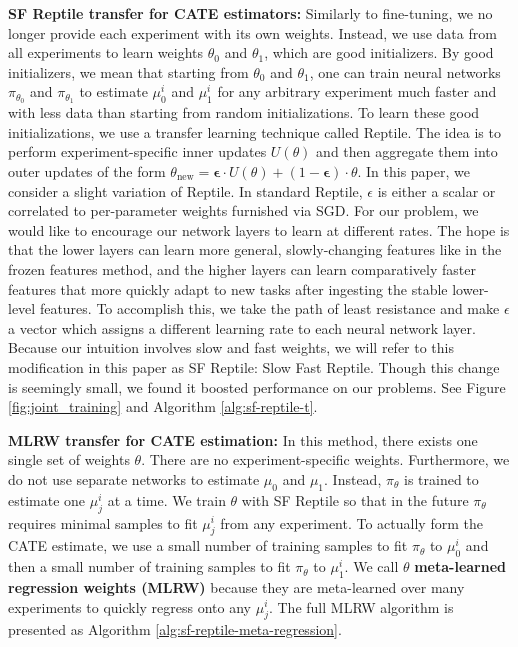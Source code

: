 
\textbf{SF Reptile transfer for CATE estimators:} Similarly to fine-tuning, we no longer provide each experiment with its own weights. Instead, we use data from all experiments to learn weights $\theta_0$ and $\theta_1$, which are good initializers. By good initializers, we mean that starting from $\theta_0$ and $\theta_1$, one can train neural networks $\pi_{\theta_0}$ and $\pi_{\theta_1}$ to estimate $\mu^i_0$ and $\mu^i_1$ for any arbitrary experiment much faster and with less data than starting from random initializations. To learn these good initializations, we use a transfer learning technique called Reptile. The idea is to perform experiment-specific inner updates $U(\theta)$ and then aggregate them into outer updates of the form $\theta_{\text{new}} = \mathbf{\epsilon} \cdot U(\theta) + (1- \mathbf{\epsilon}) \cdot \theta$. In this paper, we consider a slight variation of Reptile. In standard Reptile, $\epsilon$ is either a scalar or correlated to per-parameter weights furnished via SGD. For our problem, we would like to encourage our network layers to learn at different rates. The hope is that the lower layers can learn more general, slowly-changing features like in the frozen features method, and the higher layers can learn comparatively faster features that more quickly adapt to new tasks after ingesting the stable lower-level features. To accomplish this, we take the path of least resistance and make $\epsilon$ a vector which assigns  a different learning rate to each neural network layer. Because our intuition involves slow and fast weights, we will refer to this modification in this paper as SF Reptile: Slow Fast Reptile. Though this change is seemingly small, we found it boosted performance on our problems. See Figure \ref{fig:joint_training} and Algorithm \ref{alg:sf-reptile-t}.

\textbf{MLRW transfer for CATE estimation:} In this method, there exists one single set of weights $\theta$. There are no experiment-specific weights. Furthermore, we do not use separate networks to estimate $\mu_0$ and $\mu_1$. Instead, $\pi_\theta$ is trained to estimate one $\mu_j^i$ at a time. We train $\theta$ with SF Reptile so that in the future $\pi_\theta$ requires minimal samples to fit $\mu_j^i$ from any experiment. To actually form the CATE estimate, we use a small number of training samples to fit $\pi_\theta$ to $\mu_0^i$ and then a small number of training samples to fit $\pi_\theta$ to $\mu_1^i$. We call $\theta$ \textbf{meta-learned regression weights (MLRW)} because they are meta-learned over many experiments to quickly regress onto any $\mu_j^i$. The full MLRW algorithm is presented as Algorithm \ref{alg:sf-reptile-meta-regression}. 





